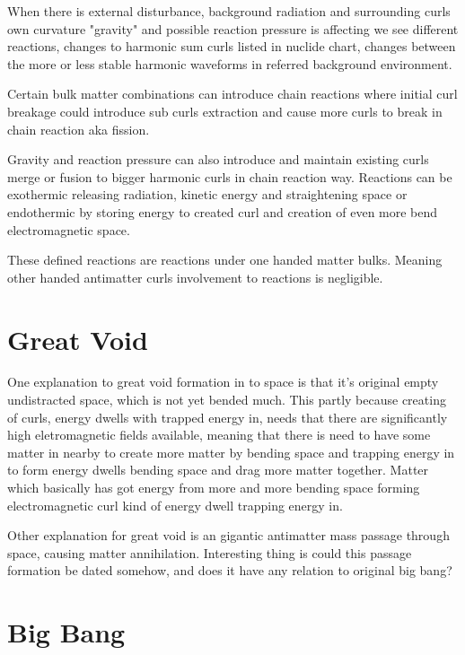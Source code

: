 When there is external disturbance, background radiation and surrounding curls
own curvature "gravity" and possible reaction pressure is affecting we see
different reactions, changes to harmonic sum curls listed in nuclide
chart\allowbreak\cite{Nuclides}, changes between the more or less stable
harmonic waveforms in referred background environment.

Certain bulk matter combinations can introduce chain reactions where initial
curl breakage could introduce sub curls extraction and cause more curls to
break in chain reaction aka fission.

Gravity and reaction pressure can also introduce and maintain existing curls
merge or fusion to bigger harmonic curls in chain reaction way. Reactions can
be exothermic releasing radiation, kinetic energy and straightening space or
endothermic by storing energy to created curl and creation of even more bend
electromagnetic space.

These defined reactions are reactions under one handed matter bulks. Meaning
other handed antimatter curls involvement to reactions is negligible.

\section{Great Void}
\label{great_void}

One explanation to great void formation in to space is that it's original
empty undistracted space, which is not yet bended much. This partly because
creating of curls, energy dwells with trapped energy in, needs that there are
significantly high eletromagnetic fields available, meaning that there is need
to have some matter in nearby to create more matter by bending space and
trapping energy in to form energy dwells bending space and drag more matter
together. Matter which basically has got energy from more and more bending
space forming electromagnetic curl kind of energy dwell trapping energy in.

Other explanation for great void is an gigantic antimatter mass passage
through space, causing matter annihilation. Interesting thing is could this
passage formation be dated somehow, and does it have any relation to original
big bang?

\section{Big Bang}
\label{big_bang}

